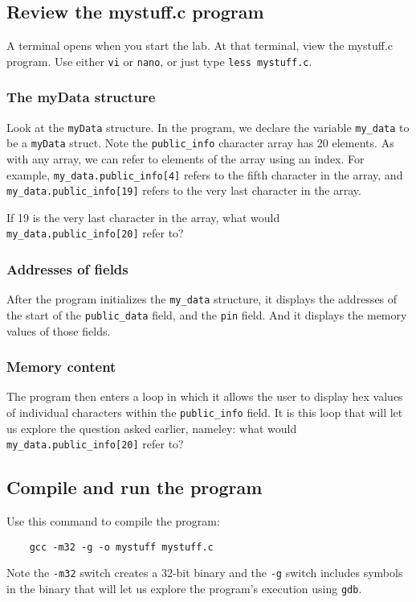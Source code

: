 \subsection{Review the mystuff.c program}
A terminal opens when you start the lab.  At that terminal, view the mystuff.c program.  Use either {\tt vi} or {\tt nano}, or just type {\tt less mystuff.c}.

\subsubsection{The myData structure}
Look at the {\tt myData} structure.  
In the program, we declare the variable {\tt my\_data} to be a {\tt myData} struct.
Note the {\tt public\_info} character array has 20 elements.  As with any array, we can refer 
to elements of the array using an index. For example, {\tt my\_data.public\_info[4]} refers to the
fifth character in the array, and {\tt my\_data.public\_info[19]} refers to the very last character
in the array.

If 19 is the very last character in the array, what would {\tt my\_data.public\_info[20]} refer to?

\subsubsection{Addresses of fields}
After the program initializes the {\tt my\_data} structure, it displays the addresses of the
start of the {\tt public\_data} field, and the {\tt pin} field.  And it displays the memory values of those
fields.

\subsubsection{Memory content}
The program then enters a loop in which it allows the user to display hex values of individual characters
within the {\tt public\_info} field.  It is this loop that will let us explore the question asked earlier,
nameley: what would {\tt my\_data.public\_info[20]} refer to?

\subsection{Compile and run the program}
Use this command to compile the program:
\begin{verbatim}
    gcc -m32 -g -o mystuff mystuff.c
\end{verbatim}
\noindent Note the {\tt -m32} switch creates a 32-bit binary and the {\tt -g} switch includes symbols in the 
binary that will let us explore the program's execution using {\tt gdb}.

